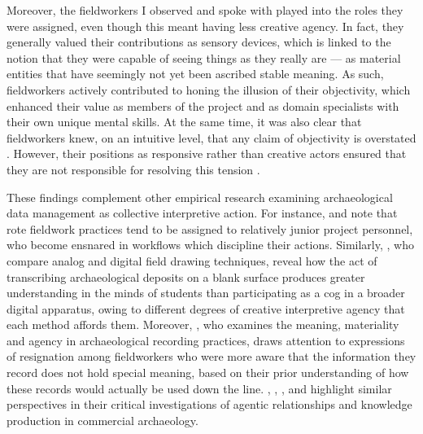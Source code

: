 \documentclass{article}
\begin{document}
Moreover, the fieldworkers I observed and spoke with played into the
roles they were assigned, even though this meant having less creative
agency. In fact, they generally valued their contributions as sensory
devices, which is linked to the notion that they were capable of seeing
things as they really are --- as material entities that have seemingly
not yet been ascribed stable meaning. As such, fieldworkers actively
contributed to honing the illusion of their objectivity, which enhanced
their value as members of the project and as domain specialists with
their own unique mental skills. At the same time, it was also clear that
fieldworkers knew, on an intuitive level, that any claim of objectivity
is overstated \parencite[as per complementary work published
in][12]{batist2024a}. However, their positions as responsive rather than
creative actors ensured that they are not responsible for resolving this
tension \parencite[cf.][]{batist-alienation}.

These findings complement other empirical research examining
archaeological data management as collective interpretive action. For
instance, \textcite{batist2021} and \textcite{batist-alienation} note
that rote fieldwork practices tend to be assigned to relatively junior
project personnel, who become ensnared in workflows which discipline
their actions. Similarly, \textcite{morgan2018}, who compare analog and
digital field drawing techniques, reveal how the act of transcribing
archaeological deposits on a blank surface produces greater
understanding in the minds of students than participating as a cog in a
broader digital apparatus, owing to different degrees of creative
interpretive agency that each method affords them. Moreover,
\textcite{yarrow2008}, who examines the meaning, materiality and agency
in archaeological recording practices, draws attention to expressions of
resignation among fieldworkers who were more aware that the information
they record does not hold special meaning, based on their prior
understanding of how these records would actually be used down the line.
\textcite{edgeworth1991}, \textcite{zorzin2010}, \textcite{thorpe2012}, and \textcite{watson2019} highlight similar perspectives in their
critical investigations of agentic relationships and knowledge
production in commercial archaeology.
\end{document}
